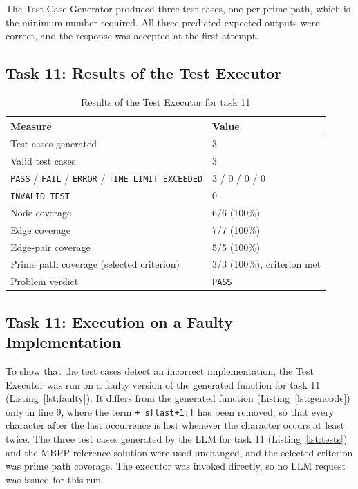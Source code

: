 \documentclass[11pt, a4paper]{article}
\begin{document}
The Test Case Generator produced three test cases, one per prime path, which is the minimum number required. All three predicted expected outputs were correct, and the response was accepted at the first attempt.

\subsection{Task 11: Results of the Test Executor}

\begin{table}[H]
    \centering
    \small
    \begin{tabular}{ll}
        \toprule
        \textbf{Measure} & \textbf{Value} \\
        \midrule
        Test cases generated & 3 \\
        Valid test cases & 3 \\
        \texttt{PASS} / \texttt{FAIL} / \texttt{ERROR} / \texttt{TIME LIMIT EXCEEDED} & 3 / 0 / 0 / 0 \\
        \texttt{INVALID TEST} & 0 \\
        Node coverage & 6/6 (100\%) \\
        Edge coverage & 7/7 (100\%) \\
        Edge-pair coverage & 5/5 (100\%) \\
        Prime path coverage (selected criterion) & 3/3 (100\%), criterion met \\
        Problem verdict & \texttt{PASS} \\
        \bottomrule
    \end{tabular}
    \caption{Results of the Test Executor for task 11}
\end{table}

\subsection{Task 11: Execution on a Faulty Implementation}
\label{sec:faulty}

To show that the test cases detect an incorrect implementation, the Test Executor was run on a faulty version of the generated function for task 11 (Listing~\ref{lst:faulty}). It differs from the generated function (Listing~\ref{lst:gencode}) only in line 9, where the term \texttt{+ s[last+1:]} has been removed, so that every character after the last occurrence is lost whenever the character occurs at least twice. The three test cases generated by the LLM for task 11 (Listing~\ref{lst:tests}) and the MBPP reference solution were used unchanged, and the selected criterion was prime path coverage. The executor was invoked directly, so no LLM request was issued for this run.
\end{document}

